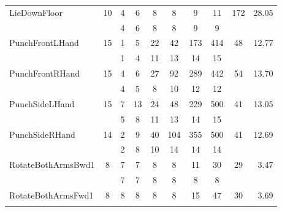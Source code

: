 \begin{table}[t]
\begin{center}
\begin{tabular}{|l|c|*{6}{c}|c|r|}
\hline \multirow{2}{*}{                  LieDownFloor} &
\multirow{2}{*}{  10} & {\tiny    4} & {\tiny    6} & {\tiny 8}
& {\tiny    8} & {\tiny    9} & {\tiny   11} & \multirow{2}{*}{
172} & \multirow{2}{*}{ 28.05} \\ & &
{\tiny    4} & {\tiny    6} & {\tiny    8} & {\tiny    8} & {\tiny    9} & {\tiny    9} & & \\
\hline \multirow{2}{*}{              PunchFrontLHand} &
\multirow{2}{*}{  15} & {\tiny    1} & {\tiny    5} & {\tiny
22} & {\tiny   42} & {\tiny  173} & {\tiny  414} &
\multirow{2}{*}{    48} & \multirow{2}{*}{ 12.77} \\ & &
{\tiny    1} & {\tiny    4} & {\tiny   11} & {\tiny   13} & {\tiny   14} & {\tiny   15} & & \\
\hline \multirow{2}{*}{              PunchFrontRHand} &
\multirow{2}{*}{  15} & {\tiny    4} & {\tiny    6} & {\tiny
27} & {\tiny   92} & {\tiny  289} & {\tiny  442} &
\multirow{2}{*}{    54} & \multirow{2}{*}{ 13.70} \\ & &
{\tiny    4} & {\tiny    5} & {\tiny    8} & {\tiny   10} & {\tiny   12} & {\tiny   12} & & \\
\hline \multirow{2}{*}{               PunchSideLHand} &
\multirow{2}{*}{  15} & {\tiny    7} & {\tiny   13} & {\tiny
24} & {\tiny   48} & {\tiny  229} & {\tiny  500} &
\multirow{2}{*}{    41} & \multirow{2}{*}{ 13.05} \\ & &
{\tiny    5} & {\tiny    8} & {\tiny   11} & {\tiny   13} & {\tiny   14} & {\tiny   15} & & \\
\hline \multirow{2}{*}{               PunchSideRHand} &
\multirow{2}{*}{  14} & {\tiny    2} & {\tiny    9} & {\tiny
40} & {\tiny  104} & {\tiny  355} & {\tiny  500} &
\multirow{2}{*}{    41} & \multirow{2}{*}{ 12.69} \\ & &
{\tiny    2} & {\tiny    8} & {\tiny   10} & {\tiny   14} & {\tiny   14} & {\tiny   14} & & \\
\hline \multirow{2}{*}{   RotateBothArmsBwd1} & \multirow{2}{*}{
8} & {\tiny    7} & {\tiny    7} & {\tiny    8} & {\tiny    8} &
{\tiny   11} & {\tiny   30} & \multirow{2}{*}{    29} &
\multirow{2}{*}{  3.47} \\ & &
{\tiny    7} & {\tiny    7} & {\tiny    8} & {\tiny    8} & {\tiny    8} & {\tiny    8} & & \\
\hline \multirow{2}{*}{    RotateBothArmsFwd1} &
\multirow{2}{*}{   8} & {\tiny    8} & {\tiny    8} & {\tiny
8} & {\tiny    8} & {\tiny   15} & {\tiny   47} &
\multirow{2}{*}{    30} & \multirow{2}{*}{  3.69} \\ & &

\end{tabular}
\end{center}
\end{table}
